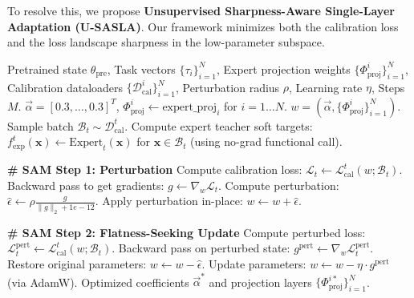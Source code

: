 \documentclass{article}
\theoremstyle{plain}
\theoremstyle{definition}
\theoremstyle{remark}
\begin{document}
To resolve this, we propose \textbf{Unsupervised Sharpness-Aware Single-Layer Adaptation (U-SASLA)}. Our framework minimizes both the calibration loss and the loss landscape sharpness in the low-parameter subspace. 

\begin{algorithm}[tb]
\caption{U-SASLA Calibration}
\label{alg:usasla}
\begin{algorithmic}[1]
 Pretrained state $\theta_{\text{pre}}$, Task vectors $\{\tau_i\}_{i=1}^N$, Expert projection weights $\{\Phi_{\text{proj}}^i\}_{i=1}^N$, Calibration dataloaders $\{\mathcal{D}_{\text{cal}}^i\}_{i=1}^N$, Perturbation radius $\rho$, Learning rate $\eta$, Steps $M$.
 $\vec{\alpha} = [0.3, \dots, 0.3]^T$, $\Phi_{\text{proj}}^i \leftarrow \text{expert\_proj}_i$ for $i=1 \dots N$.
 $w = (\vec{\alpha}, \{\Phi_{\text{proj}}^i\}_{i=1}^N)$.
    \STATE Sample batch $\mathcal{B}_t \sim \mathcal{D}_{\text{cal}}^t$.
    \STATE Compute expert teacher soft targets: 
    \STATE $f_{\text{exp}}^t(\mathbf{x}) \leftarrow \text{Expert}_t(\mathbf{x})$ for $\mathbf{x} \in \mathcal{B}_t$ (using no-grad functional call).
    
    \STATE \textbf{\# SAM Step 1: Perturbation}
    \STATE Compute calibration loss: $\mathcal{L}_t \leftarrow \mathcal{L}_{\text{cal}}^t(w; \mathcal{B}_t)$.
    \STATE Backward pass to get gradients: $g \leftarrow \nabla_w \mathcal{L}_t$.
    \STATE Compute perturbation: $\hat{\epsilon} \leftarrow \rho \frac{g}{\|g\|_2 + 1e-12}$.
    \STATE Apply perturbation in-place: $w \leftarrow w + \hat{\epsilon}$.
    
    \STATE \textbf{\# SAM Step 2: Flatness-Seeking Update}
    \STATE Compute perturbed loss: $\mathcal{L}_t^{\text{pert}} \leftarrow \mathcal{L}_{\text{cal}}^t(w; \mathcal{B}_t)$.
    \STATE Backward pass on perturbed state: $g^{\text{pert}} \leftarrow \nabla_w \mathcal{L}_t^{\text{pert}}$.
    \STATE Restore original parameters: $w \leftarrow w - \hat{\epsilon}$.
    \STATE Update parameters: $w \leftarrow w - \eta \cdot g^{\text{pert}}$ (via AdamW).
  \ENDFOR
\ENDFOR
{} Optimized coefficients $\vec{\alpha}^*$ and projection layers $\{\Phi_{\text{proj}}^{i*}\}_{i=1}^N$.
\end{algorithmic}
\end{algorithm}
\end{document}
